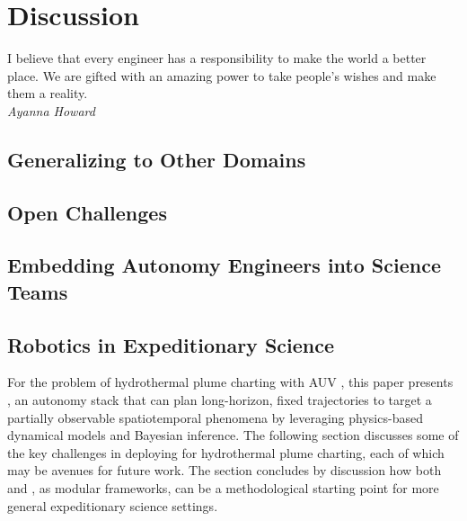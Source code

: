 \chapter{Discussion}
\label{chap:discussion}

\begin{center}
    \begin{minipage}{0.7\textwidth}
      \begin{small}
        I believe that every engineer has a responsibility to make the world a better place. We are gifted with an amazing power to take people’s wishes and make them a reality.\\ \emph{Ayanna Howard}
      \end{small}
    \end{minipage}
    \vspace{0.5cm}
\end{center}


\section{Generalizing to Other Domains}

\section{Open Challenges}

\section{Embedding Autonomy Engineers into Science Teams}

\section{Robotics in Expeditionary Science}

\label{sec:discussion}

For the problem of hydrothermal plume charting with AUV \Sentry, this paper presents \PHORTEX, an autonomy stack that can plan long-horizon, fixed trajectories to target a partially observable spatiotemporal phenomena by leveraging physics-based dynamical models and Bayesian inference. The following section discusses some of the key challenges in deploying \PHORTEX for hydrothermal plume charting, each of which may be avenues for future work. The section concludes by discussion how both \PHORTEX and \PHUMES, as modular frameworks, can be a methodological starting point for more general expeditionary science settings.

